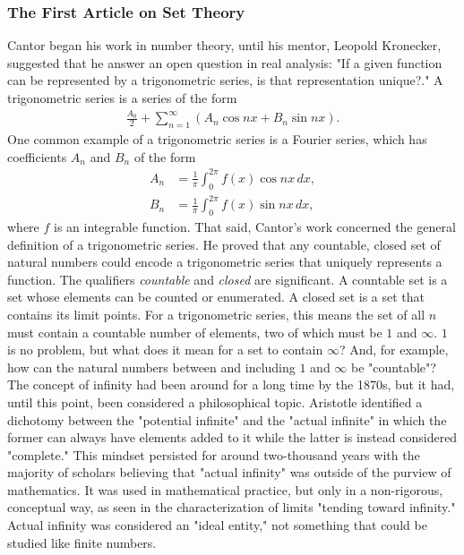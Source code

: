 \subsubsection{The First Article on Set Theory}

Cantor began his work in number theory, until his mentor, Leopold Kronecker, suggested that he answer an open question in real analysis: "If a given function can be represented by a trigonometric series, is that representation unique?." A trigonometric series is a series of the form
\begin{align*}
\frac{A_0}{2}+\sum_{n=1}^{\infty}(A_n\cos nx + B_n\sin nx).
\end{align*}
One common example of a trigonometric series is a Fourier series, which has coefficients $A_n$ and $B_n$ of the form
\begin{align*}
A_n&=\frac{1}{\pi}\int_{0}^{2\pi}f(x)\cos nx\,dx, \\[1mm]
B_n&=\frac{1}{\pi}\int_{0}^{2\pi}f(x)\sin nx\,dx,
\end{align*}
where $f$ is an integrable function. That said, Cantor's work concerned the general definition of a trigonometric series. He proved that any countable, closed set of natural numbers could encode a trigonometric series that uniquely represents a function. The qualifiers \textit{countable} and \textit{closed} are significant. A countable set is a set whose elements can be counted or enumerated. A closed set is a set that contains its limit points. For a trigonometric series, this means the set of all $n$ must contain a countable number of elements, two of which must be $1$ and $\infty$. $1$ is no problem, but what does it mean for a set to contain $\infty$? And, for example, how can the natural numbers between and including $1$ and $\infty$ be "countable"? \\

The concept of infinity had been around for a long time by the 1870s, but it had, until this point, been considered a philosophical topic. Aristotle identified a dichotomy between the "potential infinite" and the "actual infinite" in which the former can always have elements added to it while the latter is instead considered "complete." This mindset persisted for around two-thousand years with the majority of scholars believing that "actual infinity" was outside of the purview of mathematics. It was used in mathematical practice, but only in a non-rigorous, conceptual way, as seen in the characterization of limits "tending toward infinity." Actual infinity was considered an "ideal entity," not something that could be studied like finite numbers. \\

